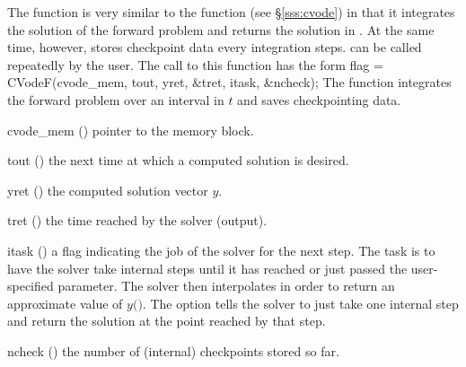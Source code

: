 The function  is very similar to the {\cvodes} function 
(see \S\ref{sss:cvode}) in that it integrates the solution of the forward
problem and returns the solution in . At the same time, however, 
 stores checkpoint data every  integration steps.  
can be called repeatedly by the user.
The call to this function has the form
{
  flag = CVodeF(cvode\_mem, tout, yret, \&tret, itask, \&ncheck);
}
{
  The function  integrates the forward problem over an interval in $t$
  and saves checkpointing data.
}
{
  \begin{args}
  \item[cvode\_mem] ()
    pointer to the {\cvodes} memory block.
  \item[tout] ()
    the next time at which a computed solution is desired.
  \item[yret] ()
    the computed solution vector $y$.
  \item[tret] ()
    the time reached by the solver (output).
  \item[itask] ()
    a flag indicating the job of the solver for the next step. 
    The  task is to have the solver take internal steps until   
    it has reached or just passed the user-specified 
    parameter. The solver then interpolates in order to   
    return an approximate value of $y($$)$. 
    The  option tells the solver to just take one internal step  
    and return the solution at the point reached by that step. 
  \item[ncheck] ()
    the number of (internal) checkpoints stored so far.
  \end{args}
}
